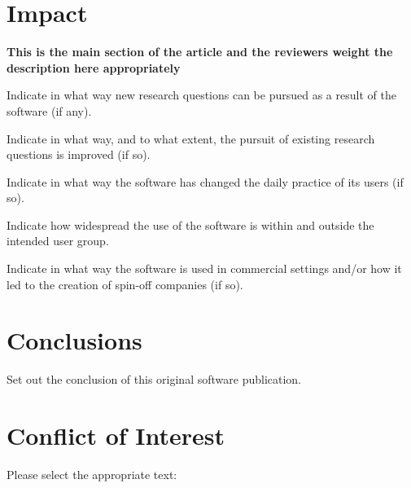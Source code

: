 \documentclass[preprint,12pt, a4paper]{elsarticle}
\newcommand{\ket}[1]{\ensuremath{|#1\rangle}}
\newcommand{\1}{{\rm 1\hspace{-0.9mm}l}}
\newcommand{\Id}{{\rm 1\hspace{-0.9mm}l}}
\newcommand{\ee}{\ensuremath{\mathrm{e}}}
\newcommand{\ii}{\ensuremath{\mathrm{i}}}
\newcommand{\PP}{\mathcal{P}}
\begin{document}







\section{Impact }


\textbf{This is the main section of the article and the reviewers weight the 
description here appropriately}

Indicate in what way new research questions can be pursued as a result of the 
software (if any).

Indicate in what way, and to what extent, the pursuit of existing research 
questions is improved (if so).

Indicate in what way the software has changed the daily practice of its users 
(if so).

Indicate how widespread the use of the software is within and outside the 
intended user group.

Indicate in what way the software is used in commercial settings and/or how it 
led to the creation of spin-off companies (if so).

\section{Conclusions}
\label{}

Set out the conclusion of this original software publication.

\section{Conflict of Interest}
Please select the appropriate text:
\end{document}
